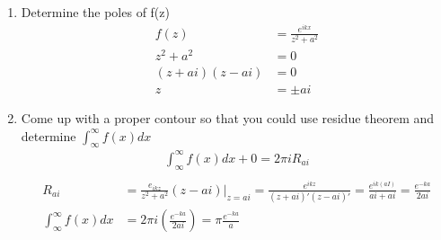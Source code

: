 \documentclass[12pt]{article}
\begin{document}
\begin{enumerate}
\begin{enumerate}
		    \item Determine the poles of f(z)
			    \begin{align*}
				    f(z)&=\frac{e^{ikx}}{z^{2}+a^{2}}\\
				    z^{2}+a^{2}&=0\\
				    (z+ai)(z-ai)&=0\\
				    z&=\pm ai
			    \end{align*}
		\item Come up with a proper contour so that you could use residue theorem and determine $\int_{\infty}^{\infty} f(x) dx$
			\begin{align*}
			    \int_{\infty}^{\infty}f(x)dx+0=2\pi i R_{ai}\\
			\end{align*}
			\begin{align*}
				R_{ai}&= \frac{e_{ikz}}{z^{2}+a^{2}}(z-ai)|_{z=ai} = \frac{e^{ikz}}{(z+ai)'(z-ai)'} = \frac{e^{ik(aI)}}{ai+ai}=\frac{e^{-ka}}{2ai}\\
				\int_{\infty}^{\infty}f(x)dx&=2 \pi i (\frac{e^{-ka}}{2ai})=\pi \frac{e^{-ka}}{a}
			\end{align*}
		\end{enumerate}


\end{enumerate}
\end{document}
